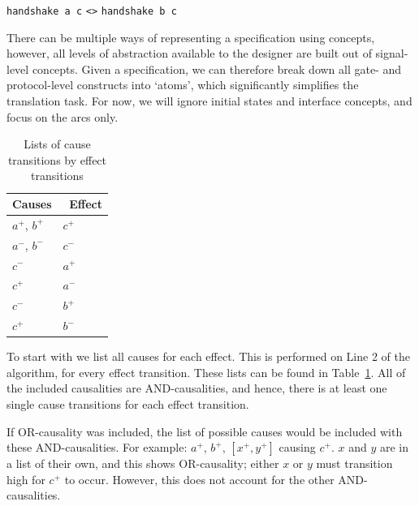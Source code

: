 \documentclass[british,conference,compsoc]{IEEEtran}
\begin{document}
\vspace{-1.5mm}

\begin{center}
   \texttt{handshake a c} \texttt{<>} \texttt{handshake b c}
\end{center}

\vspace{-1.5mm}

\noindent There can be multiple ways of representing a specification using concepts, 
however, all levels of abstraction available to the designer are built out of signal-level
concepts. Given a specification, we can therefore break down 
all gate- and protocol-level constructs into `atoms', which significantly 
simplifies the translation task. For now, we will ignore initial states and interface
concepts, and focus on the arcs only.

\begin{table}[h]
\vspace{-2mm}
\caption{Lists of cause transitions by effect transitions
		\label{tab:list-of-concepts}}
  \centering
\begin{tabular}[htb]{| m{2.7cm} | m{2.0cm} |}
  \hline
Causes & \, Effect \\ \hline \hline
$a^{+}$, $b^{+}$		& $c^{+}$ 	\\ \hline
$a^{-}$, $b^{-}$ 		& $c^{-}$ 	\\ \hline
$c^{-}$			& $a^{+}$ 	\\ \hline
$c^{+}$			& $a^{-}$ 	\\ \hline
$c^{-}$			& $b^{+}$ 	\\ \hline
$c^{+}$			& $b^{-}$ 	\\ \hline
  \end{tabular}
  \vspace{-3mm}
\end{table}

To start with we list all causes for each effect. This is performed on Line 2 of the algorithm, for every effect transition. 
These lists can be found in Table~\ref{tab:list-of-concepts}.
All of the included causalities are AND-causalities, and hence, there
is at least one single cause transitions for each effect transition. 

If OR-causality was included, the list of possible causes would be included with these
AND-causalities. For example:  $a^{+}$, $b^{+}$, $[x^{+}, y^{+}]$ causing
$c^{+}$. $x$ and $y$ are in a list of their own, and this shows OR-causality;
either $x$ or $y$ must transition high for $c^{+}$ to occur. However, this does
not account for the other AND-causalities. 
\end{document}
